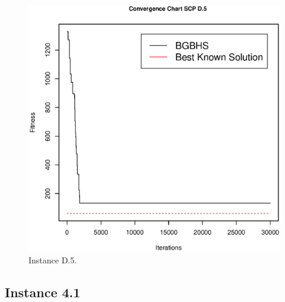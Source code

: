 \begin{figure}[]
\centering
\includegraphics[scale=.45]{Resultados/scpD5.eps}
\caption{Instance D.5.}
\label{fig:Instance.D.5}
\end{figure}
\subsection{Instance 4.1}


